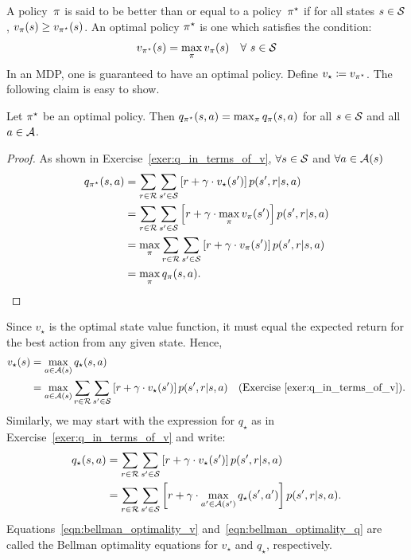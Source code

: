 A policy~$\pi$ is said to be better than or equal to a policy~$\pi^{\star}$
if for all states $s \in \mathcal{S}$, $v_{\pi}(s) \geq v_{\pi^{\star}}(s)$. 
An optimal policy $\pi^{\star}$ is one which satisfies the condition:
\begin{equation}
    v_{\pi^{\star}} (s) = \max_{\pi} v_{\pi} (s) \quad \forall \ s \in \mathcal{S}
\end{equation}
In an MDP, one is guaranteed to have an optimal policy. Define 
$v_{\star} \coloneqq v_{\pi^{\star}}$. The following claim is easy to show.
\begin{lemma}
Let $\pi^{\star}$ be an optimal policy. Then 
$q_{\pi^{\star}}(s, a) = \max_{\pi} q_{\pi} (s, a)$ for all $s \in \mathcal{S}$
and all $a \in \mathcal{A}$.
\end{lemma} 
\begin{proof}
As shown in Exercise~\ref{exer:q_in_terms_of_v}, $\forall s \in \mathcal{S}$ and 
$\forall a \in \mathcal{A} (s)$
\begin{align*}
    q_{\pi^{\star}}(s, a) 
        & = \sum_{r \in \mathcal{R}} \sum_{s' \in \mathcal{S}} \left [ r + \gamma \cdot v_{\star}(s') \right ] p(s', r \vert s, a) \\
        & = \sum_{r \in \mathcal{R}} \sum_{s' \in \mathcal{S}} \left 
                [ r + \gamma \cdot \max_{\pi} v_{\pi}(s') \right ] p(s', r \vert s, a) \\
        & = \max_{\pi} \sum_{r \in \mathcal{R}} \sum_{s' \in \mathcal{S}} \left [ r + \gamma \cdot v_{\pi}(s') \right ] p(s', r \vert s, a) \\       
        & = \max_{\pi} q_{\pi} (s, a).
\end{align*}
\end{proof}

Since $v_{\star}$ is the optimal state value function, it must equal the expected 
return for the best action from any given state. Hence,
\begin{align} \label{eqn:bellman_optimality_v}
    v_{\star} (s) & = \max_{a \in \mathcal{A} (s)} q_{\star} (s, a) \nonumber \\
        & = \max_{a \in \mathcal{A} (s)} \sum_{r \in \mathcal{R}} \sum_{s' \in \mathcal{S}} 
            \left [ r + \gamma \cdot v_{\star}(s') \right ] p(s', r \vert s, a) 
            \quad (\text{Exercise~\ref{exer:q_in_terms_of_v}}).
\end{align}
Similarly, we may start with the expression for $q_{\star}$ as in 
Exercise~\ref{exer:q_in_terms_of_v} and write:
\begin{align} \label{eqn:bellman_optimality_q}
    q_{\star} (s, a) 
        & = \sum_{r \in \mathcal{R}} \sum_{s' \in \mathcal{S}} 
            \left [ r + \gamma \cdot v_{\star}(s') \right ] p(s', r \vert s, a) \nonumber \\
        & = \sum_{r \in \mathcal{R}} \sum_{s' \in \mathcal{S}} 
            \left [ r + \gamma \cdot \max_{a' \in \mathcal{A} (s')} q_{\star} (s', a') \right ] p(s', r \vert s, a).
\end{align}
Equations~\ref{eqn:bellman_optimality_v} and~\ref{eqn:bellman_optimality_q} are 
called the Bellman optimality equations for $v_{\star}$ and $q_{\star}$, 
respectively.

